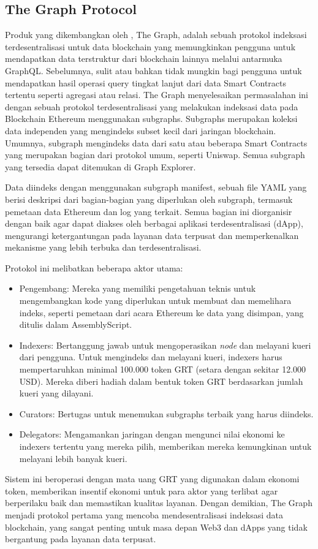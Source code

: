 \subsection{The Graph Protocol}
\label{subsec:the-graph-protocol}

Produk yang dikembangkan oleh \cite{TheGraphDocs}, The Graph, adalah sebuah protokol indeksasi terdesentralisasi untuk data blockchain yang memungkinkan pengguna untuk mendapatkan data terstruktur dari blockchain lainnya melalui antarmuka GraphQL. Sebelumnya, sulit atau bahkan tidak mungkin bagi pengguna untuk mendapatkan hasil operasi query tingkat lanjut dari data Smart Contracts tertentu seperti agregasi atau relasi. The Graph menyelesaikan permasalahan ini dengan sebuah protokol terdesentralisasi yang melakukan indeksasi data pada Blockchain Ethereum menggunakan subgraphs. Subgraphs merupakan koleksi data independen yang mengindeks subset kecil dari jaringan blockchain. Umumnya, subgraph mengindeks data dari satu atau beberapa Smart Contracts yang merupakan bagian dari protokol umum, seperti Uniswap. Semua subgraph yang tersedia dapat ditemukan di Graph Explorer.

Data diindeks dengan menggunakan subgraph manifest, sebuah file YAML yang berisi deskripsi dari bagian-bagian yang diperlukan oleh subgraph, termasuk pemetaan data Ethereum dan log yang terkait. Semua bagian ini diorganisir dengan baik agar dapat diakses oleh berbagai aplikasi terdesentralisasi (dApp), mengurangi ketergantungan pada layanan data terpusat dan memperkenalkan mekanisme yang lebih terbuka dan terdesentralisasi.

Protokol ini melibatkan beberapa aktor utama:

\begin{itemize}
	\item Pengembang: Mereka yang memiliki pengetahuan teknis untuk mengembangkan kode yang diperlukan untuk membuat dan memelihara indeks, seperti pemetaan dari acara Ethereum ke data yang disimpan, yang ditulis dalam AssemblyScript.
	\item Indexers: Bertanggung jawab untuk mengoperasikan \textit{node} dan melayani kueri dari pengguna. Untuk mengindeks dan melayani kueri, indexers harus mempertaruhkan minimal 100.000 token GRT (setara dengan sekitar 12.000 USD). Mereka diberi hadiah dalam bentuk token GRT berdasarkan jumlah kueri yang dilayani.
	\item Curators: Bertugas untuk menemukan subgraphs terbaik yang harus diindeks.
	\item Delegators: Mengamankan jaringan dengan mengunci nilai ekonomi ke indexers tertentu yang mereka pilih, memberikan mereka kemungkinan untuk melayani lebih banyak kueri.
\end{itemize}

Sistem ini beroperasi dengan mata uang GRT yang digunakan dalam ekonomi token, memberikan insentif ekonomi untuk para aktor yang terlibat agar berperilaku baik dan memastikan kualitas layanan. Dengan demikian, The Graph menjadi protokol pertama yang mencoba mendesentralisasi indeksasi data blockchain, yang sangat penting untuk masa depan Web3 dan dApps yang tidak bergantung pada layanan data terpusat.